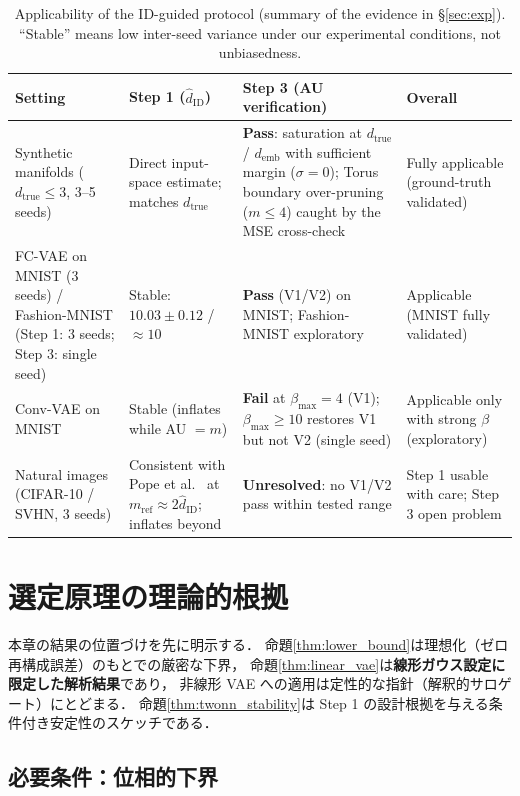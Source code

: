 \documentclass[11pt,a4paper]{jsarticle}
\newcommand{\hatdID}{\hat{d}_{\mathrm{ID}}}
\newcommand{\dtrue}{d_{\mathrm{true}}}
\newcommand{\demb}{d_{\mathrm{emb}}}
\begin{document}
\begin{table}[H]
\centering
\caption{Applicability of the ID-guided protocol (summary of the evidence in
§\ref{sec:exp}). ``Stable'' means low inter-seed variance under our
experimental conditions, not unbiasedness.}
\label{tab:applicability}
\small
\begin{tabular}{p{3.0cm}p{3.2cm}p{3.4cm}p{4.2cm}}
\toprule
Setting & Step 1 ($\hatdID$) & Step 3 (AU verification) & Overall \\
\midrule
Synthetic manifolds ($\dtrue \leq 3$, 3--5 seeds) & Direct input-space estimate; matches $\dtrue$ & \textbf{Pass}: saturation at $\dtrue$ / $\demb$ with sufficient margin ($\sigma = 0$); Torus boundary over-pruning ($m \leq 4$) caught by the MSE cross-check & Fully applicable (ground-truth validated) \\
\addlinespace
FC-VAE on MNIST (3 seeds) / Fashion-MNIST (Step 1: 3 seeds; Step 3: single seed) & Stable: $10.03 \pm 0.12$ / $\approx 10$ & \textbf{Pass} (V1/V2) on MNIST; Fashion-MNIST exploratory & Applicable (MNIST fully validated) \\
\addlinespace
Conv-VAE on MNIST & Stable (inflates while AU $= m$) & \textbf{Fail} at $\beta_{\max} = 4$ (V1); $\beta_{\max} \geq 10$ restores V1 but not V2 (single seed) & Applicable only with strong $\beta$ (exploratory) \\
\addlinespace
Natural images (CIFAR-10 / SVHN, 3 seeds) & Consistent with Pope et al.~\cite{pope2021intrinsic} at $m_{\mathrm{ref}} \approx 2\hatdID$; inflates beyond & \textbf{Unresolved}: no V1/V2 pass within tested range & Step 1 usable with care; Step 3 open problem \\
\bottomrule
\end{tabular}
\end{table}

\section{選定原理の理論的根拠}\label{sec:theory}

本章の結果の位置づけを先に明示する．
命題\ref{thm:lower_bound}は理想化（ゼロ再構成誤差）のもとでの厳密な下界，
命題\ref{thm:linear_vae}は\textbf{線形ガウス設定に限定した解析結果}であり，
非線形 VAE への適用は定性的な指針（解釈的サロゲート）にとどまる．
命題\ref{thm:twonn_stability}は Step 1 の設計根拠を与える条件付き安定性のスケッチである．

\subsection{必要条件：位相的下界}\label{sec:theory_lower}
\end{document}
